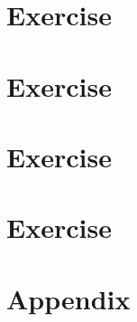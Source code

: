 \documentclass[a4paper]{article}
\begin{document}
\maketitle

\newpage
\tableofcontents
\newpage

\section{Exercise}
\subsection{}

\subsection{}

\subsection{}


\section{Exercise}
\subsection{}

\subsection{}

\subsection{}


\section{Exercise}
\subsection{}

\subsection{}

\subsection{}

\subsection{}


\section{Exercise}


\section{Appendix}

\end{document}
